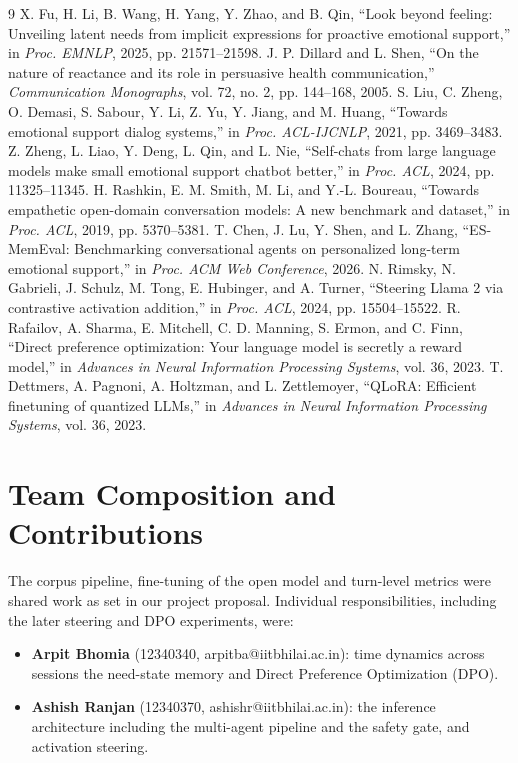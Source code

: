 \documentclass[journal]{IEEEtran}
\begin{document}
\begin{thebibliography}{9}\footnotesize
{} X. Fu, H. Li, B. Wang, H. Yang, Y. Zhao, and B. Qin, ``Look beyond feeling: Unveiling latent needs from implicit expressions for proactive emotional support,'' in \emph{Proc. EMNLP}, 2025, pp. 21571--21598.
 J. P. Dillard and L. Shen, ``On the nature of reactance and its role in persuasive health communication,'' \emph{Communication Monographs}, vol. 72, no. 2, pp. 144--168, 2005.
 S. Liu, C. Zheng, O. Demasi, S. Sabour, Y. Li, Z. Yu, Y. Jiang, and M. Huang, ``Towards emotional support dialog systems,'' in \emph{Proc. ACL-IJCNLP}, 2021, pp. 3469--3483.
 Z. Zheng, L. Liao, Y. Deng, L. Qin, and L. Nie, ``Self-chats from large language models make small emotional support chatbot better,'' in \emph{Proc. ACL}, 2024, pp. 11325--11345.
 H. Rashkin, E. M. Smith, M. Li, and Y.-L. Boureau, ``Towards empathetic open-domain conversation models: A new benchmark and dataset,'' in \emph{Proc. ACL}, 2019, pp. 5370--5381.
 T. Chen, J. Lu, Y. Shen, and L. Zhang, ``ES-MemEval: Benchmarking conversational agents on personalized long-term emotional support,'' in \emph{Proc. ACM Web Conference}, 2026.
 N. Rimsky, N. Gabrieli, J. Schulz, M. Tong, E. Hubinger, and A. Turner, ``Steering Llama 2 via contrastive activation addition,'' in \emph{Proc. ACL}, 2024, pp. 15504--15522.
 R. Rafailov, A. Sharma, E. Mitchell, C. D. Manning, S. Ermon, and C. Finn, ``Direct preference optimization: Your language model is secretly a reward model,'' in \emph{Advances in Neural Information Processing Systems}, vol. 36, 2023.
 T. Dettmers, A. Pagnoni, A. Holtzman, and L. Zettlemoyer, ``QLoRA: Efficient finetuning of quantized LLMs,'' in \emph{Advances in Neural Information Processing Systems}, vol. 36, 2023.
\end{thebibliography}

\appendices
\section{Team Composition and Contributions}
The corpus pipeline, fine-tuning of the open model and turn-level metrics were shared work as set in our project proposal. Individual responsibilities, including the later steering and DPO experiments, were:
\begin{itemize}
\item \textbf{Arpit Bhomia} (12340340, arpitba@iitbhilai.ac.in): time dynamics across sessions the need-state memory and Direct Preference Optimization (DPO).
\item \textbf{Ashish Ranjan} (12340370, ashishr@iitbhilai.ac.in): the inference architecture including the multi-agent pipeline and the safety gate, and activation steering.
\end{itemize}
\end{document}
